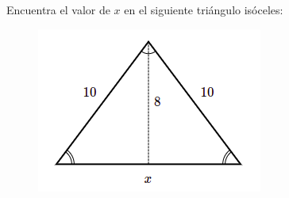 Encuentra el valor de $x$ en el siguiente triángulo isóceles:

\begin{figure}[H]
    \centering
    \includegraphics[width=0.3\linewidth]{../images/pitagoras6.png}
    \caption{}
    \label{fig:pitagoras6}
\end{figure}
